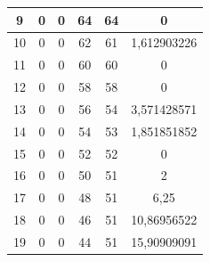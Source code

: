 \begin{table}[]
\begin{tabular}{|c|c|c|c|c|c|}
 			9                                            & 0                      & 0                     & 64                    & 64                     & 0                                                  \\ \hline
 			10                                           & 0                      & 0                     & 62                    & 61                     & 1,612903226                                        \\ \hline
 			11                                           & 0                      & 0                     & 60                    & 60                     & 0                                                  \\ \hline
 			12                                           & 0                      & 0                     & 58                    & 58                     & 0                                                  \\ \hline
 			13                                           & 0                      & 0                     & 56                    & 54                     & 3,571428571                                        \\ \hline
 			14                                           & 0                      & 0                     & 54                    & 53                     & 1,851851852                                        \\ \hline
 			15                                           & 0                      & 0                     & 52                    & 52                     & 0                                                  \\ \hline
 			16                                           & 0                      & 0                     & 50                    & 51                     & 2                                                  \\ \hline
 			17                                           & 0                      & 0                     & 48                    & 51                     & 6,25                                               \\ \hline
 			18                                           & 0                      & 0                     & 46                    & 51                     & 10,86956522                                        \\ \hline
 			19                                           & 0                      & 0                     & 44                    & 51                     & 15,90909091                                        \\ \hline

\end{tabular}
\end{table}
